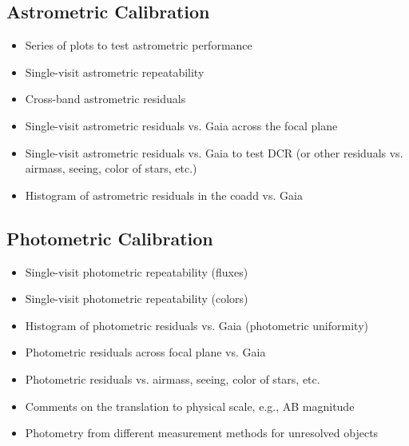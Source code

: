\subsection{Astrometric Calibration}

\begin{itemize}

\item Series of plots to test astrometric performance

\item Single-visit astrometric repeatability

\item Cross-band astrometric residuals

\item Single-visit astrometric residuals vs. Gaia across the focal plane

\item Single-visit astrometric residuals vs. Gaia to test DCR (or other residuals vs. airmass, seeing, color of stars, etc.)

\item Histogram of astrometric residuals in the coadd vs. Gaia

\end{itemize}



\subsection{Photometric Calibration}

\begin{itemize}

\item Single-visit photometric repeatability (fluxes)

\item Single-visit photometric repeatability (colors)

\item Histogram of photometric residuals vs. Gaia (photometric uniformity)

\item Photometric residuals across focal plane vs. Gaia

\item Photometric residuals vs. airmass, seeing, color of stars, etc.

\item Comments on the translation to physical scale, e.g., AB magnitude 

\item Photometry from different measurement methods for unresolved objects

\end{itemize}

